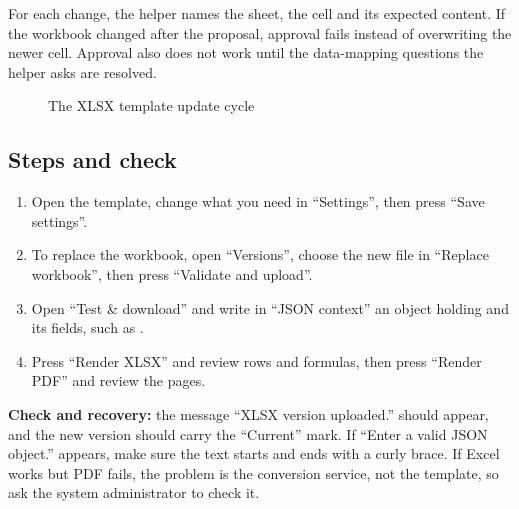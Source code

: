 \begin{rcwarn}
For each change, the helper names the sheet, the cell and its expected content. If the workbook changed after the proposal, approval fails instead of overwriting the newer cell. Approval also does not work until the data-mapping questions the helper asks are resolved.
\end{rcwarn}

\begin{figure}[H]
\centering
{}
\rclegend
\caption{The XLSX template update cycle}
\label{fig:builder-xlsx-workspace-flow}
\end{figure}

\subsection{Steps and check}
\begin{enumerate}
\item Open the template, change what you need in “Settings”, then press “Save settings”.
\item To replace the workbook, open “Versions”, choose the new file in “Replace workbook”, then press “Validate and upload”.
\item Open “Test \& download” and write in “JSON context” an object holding  and its fields, such as .
\item Press “Render XLSX” and review rows and formulas, then press “Render PDF” and review the pages.
\end{enumerate}

\textbf{Check and recovery:} the message “XLSX version uploaded.” should appear, and the new version should carry the “Current” mark. If “Enter a valid JSON object.” appears, make sure the text starts and ends with a curly brace. If Excel works but PDF fails, the problem is the conversion service, not the template, so ask the system administrator to check it.

